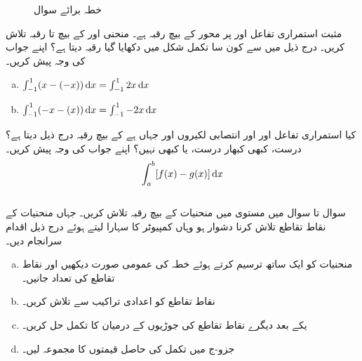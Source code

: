 \begin{figure}
\begin{minipage}{0.25\textwidth}
\caption{خطہ برائے سوال }
\label{شکل_سوال_تکمل_استعمال_رقبہ_محیط_خاکہ_پ}
\end{minipage}
\end{figure}
%
مثبت استمراری تفاعل  اور  پر محور  کے بیچ رقبہ  ہے۔ منحنی  اور  کے بیچ     تا  رقبہ تلاش کریں۔
درج ذیل میں سے کون سا تکمل شکل  میں دکھایا گیا رقبہ دیتا ہے؟ اپنے جواب کی وجہ پیش کریں۔
\begin{enumerate}[a.]
\item
$\int_{-1}^1(x-(-x))\dif x=\int_{-1}^12x\dif x$
\item
$\int_{-1}^1(-x-(x))\dif x=\int_{-1}^1-2x\dif x$
\end{enumerate}
کیا استمراری تفاعل  اور  اور انتصابی لکیروں  اور  جہاں  ہے کے بیچ رقبہ درج ذیل دیتا ہے؟ درست، کبھی کبھار درست،  یا کبھی نہیں؟ اپنے جواب کی وجہ پیش کریں۔
\begin{align*}
\int_a^b[f(x)-g(x)]\dif x
\end{align*}
\\
سوال  تا سوال  میں مستوی میں منحنیات کے بیچ رقبہ تلاش کریں۔ جہاں منحنیات کے نقاط تقاطع تلاش کرنا دشوار ہو وہاں کمپیوٹر کا سہارا لیتے ہوئے درج ذیل اقدام سرانجام دیں۔
\begin{enumerate}[a.]
\item
منحنیات کو ایک ساتھ ترسیم کرتے ہوئے خطہ کی عمومی صورت دیکھیں اور نقاط تقاطع کی تعداد جانیں۔
\item
نقاط تقاطع کو اعدادی تراکیب سے تلاش کریں۔
\item
یکے  بعد دیگرے  نقاط تقاطع کی  جوڑیوں  کے  درمیان  کا تکمل حل کریں۔
\item
جزو-ج میں تکمل کی حاصل قیمتوں کا مجموعہ لیں۔
\end{enumerate}

